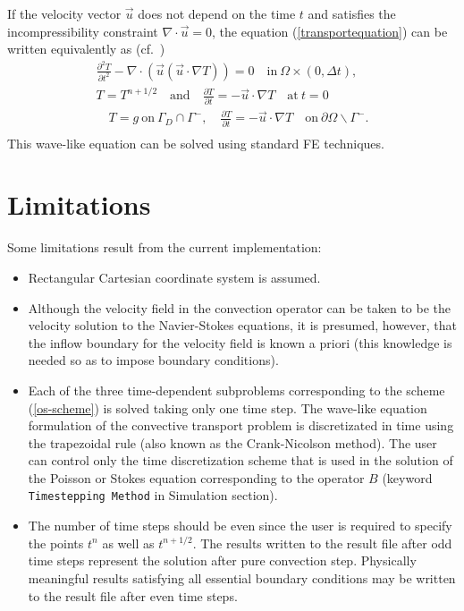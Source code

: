 If the velocity vector $\vec u$ does not depend on the time $t$ and satisfies 
the incompressibility constraint $\nabla\cdot\vec u=0$, the equation 
(\ref{transportequation}) can be written equivalently as (cf.\ \cite{Wu97})
\begin{equation}
\begin{split}
\frac{\partial^2 T}{\partial t^2}-\nabla \cdot \left( \vec u(\vec u \cdot 
\nabla T) \right)=0 \quad  \mathrm{in}\ \Omega \times (0,\Delta t), \\
T=T^{n+1/2}\quad \mathrm{and}\quad 
\frac{\partial T}{\partial t}= -\vec u \cdot \nabla T\quad \mathrm{at}\ t=0 \\
\quad T=g \ \mathrm{on}\ \Gamma_D \cap \Gamma^-, \quad 
\frac{\partial T}{\partial t}= -\vec u \cdot \nabla T \quad \mathrm{on}\ 
\partial\Omega \backslash \Gamma^-. \\
\end{split}
\end{equation}
This wave-like equation can be solved using standard FE techniques.


\section{Limitations}

Some limitations result from the current implementation:
\begin{itemize}
\item Rectangular Cartesian coordinate system is assumed.

\item Although the velocity field in the convection operator can be taken to 
be the velocity solution to the Navier-Stokes equations, it is presumed, 
however, that the inflow boundary for the velocity field is known a priori
(this knowledge is needed so as to impose boundary conditions).
 
\item Each of the three time-dependent subproblems corresponding to the scheme 
(\ref{os-scheme}) is solved taking only one time step. 
The wave-like equation formulation of the convective transport problem
is discretizated in time using the 
trapezoidal rule (also known as the Crank-Nicolson method). The user can
control only the time discretization scheme that is used in the solution of
the Poisson or Stokes equation corresponding to the operator $B$ 
(keyword {\tt Timestepping Method} in Simulation section).  

\item The number of time steps should be even since the user is required to
specify the points $t^n$ as well as $t^{n+1/2}$. The results written to
the result file after odd time steps represent the solution after pure 
convection step. Physically meaningful results satisfying all essential 
boundary conditions may be written to the result file after even time steps.  


\end{itemize}

